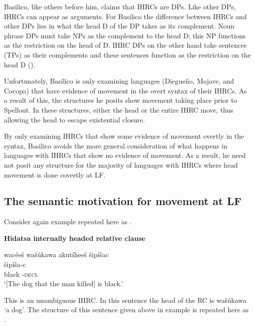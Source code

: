 \documentclass[output=paper]{LSP/langsci}
\begin{document}
Basilico, like others before him, claims that IHRCs are DPs. Like other DPs, IHRCs can appear as arguments. For Basilico the difference between IHRCs and other DPs lies in what the head D of the DP takes as its complement. Noun phrase DPs must take NPs as the complement to the head D; this NP functions as the restriction on the head of D. IHRC DPs on the other hand take sentences (TPs) as their complements and these sentences function as the restriction on the head D (\citealt{Basilico1996}). 
	
Unfortunately, Basilico is only examining languages (Diegue\~no, Mojave, and Cocopa) that have evidence of movement in the overt syntax of their IHRCs. As a result of this, the structures he posits show movement taking place prior to Spellout. In these structures, either the head or the entire IHRC move, thus allowing the head to escape existential closure.   
	
By only examining IHRCs that show some evidence of movement overtly in the syntax, Basilico avoids the more general consideration of what happens in languages with IHRCs that show no evidence of movement. As a result, he need not posit any structure for the majority of languages with IHRCs where head movement is done covertly at LF.  

\subsection{The semantic motivation for movement at LF}

Consider again example  repeated here as .

\ea \textbf{Hidatsa internally headed relative clause} \label{boyle46}

\glll {\ob}wac\'ee\v{s} wa\v{s}\'ukawa akut\'ihee\v{s}{\cb} \v{s}ip\'i\v{s}ac\\
[wac\'ee-\v{s}   wa\v{s}\'uka-wa  aku-t\'i-hee-\v{s}]  \v{s}ip\'i\v{s}a-c\\
[man-\textsc{det.d} dog-\textsc{det.i}  \textsc{rel.s}-die-\textsc{3.caus.d.sg}-\textsc{det.d}] black -\textsc{decl}\\
\trans `[The dog that the man killed] is black.' 
\z

This is an unambiguous IHRC. In this sentence the head of the RC is wa\v{s}\'ukawa `a dog'. The structure of this sentence given above in example  is repeated here as . 

\ea 	\label{boyle47}
{\hspace{1em}}\newline
\end{document}
